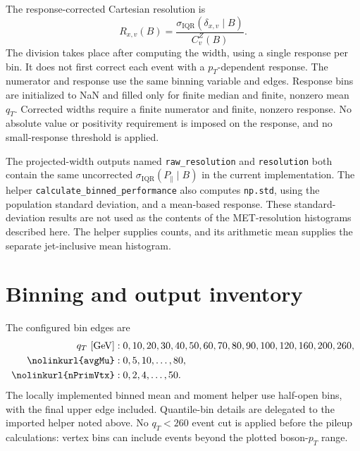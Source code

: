 \documentclass[11pt,a4paper]{article}
\newcommand{\code}[1]{\texttt{\nolinkurl{#1}}}
\newcommand{\sigq}{\sigma_{\mathrm{IQR}}}
\begin{document}
The response-corrected Cartesian resolution is
\begin{equation}
 R_{x,v}(B)=\frac{\sigq(\delta_{x,v}\mid B)}{C_v^Z(B)}.
\end{equation}
The division takes place after computing the width, using a single response
per bin. It does not first correct each event with a $p_T$-dependent response.
The numerator and response use the same binning variable and edges. Response
bins are initialized to NaN and filled only for finite median and finite,
nonzero mean $q_T$. Corrected widths require a finite numerator and finite,
nonzero response. No absolute value or positivity requirement is imposed on
the response, and no small-response threshold is applied.

The projected-width outputs named \code{raw_resolution} and
\code{resolution} both contain the same uncorrected
$\sigq(P_\parallel\mid B)$ in the current implementation.
The helper \code{calculate_binned_performance} also computes
\code{np.std}, using the population standard deviation, and a mean-based
response. These standard-deviation results are not used as the contents of
the MET-resolution histograms described here. The helper supplies counts,
and its arithmetic mean supplies the separate jet-inclusive mean histogram.

\section{Binning and output inventory}
The configured bin edges are
\begin{align*}
 q_T\ [\mathrm{GeV}]:\;&0,10,20,30,40,50,60,70,80,90,100,120,160,200,260,\\
 \code{avgMu}:\;&0,5,10,\ldots,80,\\
 \code{nPrimVtx}:\;&0,2,4,\ldots,50.
\end{align*}
The locally implemented binned mean and moment helper use half-open bins,
with the final upper edge included. Quantile-bin details are delegated to
the imported helper noted above. No $q_T<260$ event cut is applied before
the pileup calculations: vertex bins can include events beyond the plotted
boson-$p_T$ range.
\end{document}
